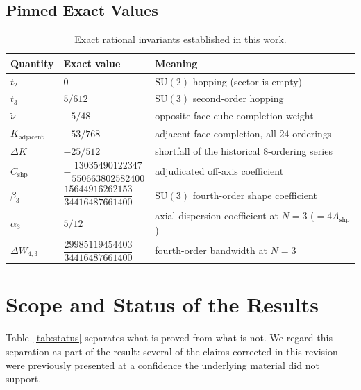 \documentclass[11pt,a4paper]{article}
\theoremstyle{definition}
\newcommand{\SU}{\mathrm{SU}}
\newcommand{\Ashp}{A_{\mathrm{shp}}}
\newcommand{\Cshp}{C_{\mathrm{shp}}}
\begin{document}
\subsection{Pinned Exact Values}

\begin{table}[htbp]
\centering
\caption{Exact rational invariants established in this work.}\label{tab:pinned_invariants}
\vspace{0.5em}
\small
\begin{tabular}{@{}llp{6.4cm}@{}}
\toprule
Quantity & Exact value & Meaning \\
\midrule
$t_2$ & $0$ & $\SU(2)$ hopping (sector is empty) \\
$t_3$ & $5/612$ & $\SU(3)$ second-order hopping \cite{Hamer1989} \\
$\tilde\nu$ & $-5/48$ & opposite-face cube completion weight \\
$K_{\mathrm{adjacent}}$ & $-53/768$ & adjacent-face completion, all $24$ orderings \\
$\Delta K$ & $-25/512$ & shortfall of the historical $8$-ordering series \\
$\Cshp$ & $-\dfrac{13035490122347}{550663802582400}$ & adjudicated off-axis coefficient \\
$\beta_3$ & $\dfrac{15644916262153}{34416487661400}$ & $\SU(3)$ fourth-order shape coefficient \\
$\alpha_3$ & $5/12$ & axial dispersion coefficient at $N=3$ ($=4\Ashp$) \\
$\Delta W_{4,3}$ & $\dfrac{29985119454403}{34416487661400}$ & fourth-order bandwidth at $N=3$ \\
\bottomrule
\end{tabular}
\end{table}

\section{Scope and Status of the Results}\label{sec:scope}

Table~\ref{tab:status} separates what is proved from what is not. We regard this separation as part of the result: several of the claims corrected in this revision were previously presented at a confidence the underlying material did not support.
\end{document}

